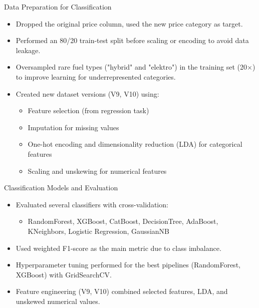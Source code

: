 \documentclass{beamer}
\begin{document}
\begin{frame}{Data Preparation for Classification}
    \begin{itemize}
        \item Dropped the original price column, used the new price category as target.
        \item Performed an 80/20 train-test split before scaling or encoding to avoid data leakage.
        \item Oversampled rare fuel types ("hybrid" and "elektro") in the training set (20$\times$) to improve learning for underrepresented categories.
        \item Created new dataset versions (V9, V10) using:
        \begin{itemize}
            \item Feature selection (from regression task)
            \item Imputation for missing values
            \item One-hot encoding and dimensionality reduction (LDA) for categorical features
            \item Scaling and unskewing for numerical features
        \end{itemize}
    \end{itemize}
\end{frame}


\begin{frame}{Classification Models and Evaluation}
    \begin{itemize}
        \item Evaluated several classifiers with cross-validation:
        \begin{itemize}
            \item RandomForest, XGBoost, CatBoost, DecisionTree, AdaBoost, KNeighbors, Logistic Regression, GaussianNB
        \end{itemize}
        \item Used weighted F1-score as the main metric due to class imbalance.
        \item Hyperparameter tuning performed for the best pipelines (RandomForest, XGBoost) with GridSearchCV.
        \item Feature engineering (V9, V10) combined selected features, LDA, and unskewed numerical values.
    \end{itemize}
\end{frame}
\end{document}
